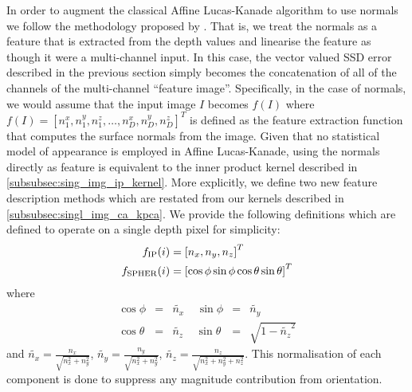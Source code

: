 In order to augment the classical Affine Lucas-Kanade algorithm to use normals
we follow the methodology proposed by \citet{antonakos2015feature}. That is,
we treat the normals as a feature that is extracted from the depth values
and linearise the feature as though it were a multi-channel input. In this case,
the vector valued SSD error described in the previous section simply
becomes the concatenation of all of the channels of the multi-channel
``feature image''. Specifically, in the case of normals, we would assume
that the input image $I$ becomes $f(I)$ where
$f(I) = {[n^x_1, n^y_1, n^z_1, \ldots, n^x_D, n^y_D, n^z_D]}^T$ is defined as 
the feature extraction function that computes the surface normals from the 
image. Given that no statistical model of appearance is employed in Affine
Lucas-Kanade, using the normals directly as feature is equivalent to
the inner product kernel described in \cref{subsubsec:sing_img_ip_kernel}.
More explicitly, we define two new feature description methods which are
restated from our kernels described in \cref{subsubsec:singl_img_ca_kpca}.
We provide the following definitions which are defined to operate on a single
depth pixel for simplicity:
\begin{equation}
    \begin{aligned}\label{eq:normal_feature_functions}
        f_{\operatorname{IP}}(i)    &= {[n_x, n_y, n_z]}^T \\
        f_{\operatorname{SPHER}}(i) &= {[\cos \phi \sin \phi \cos \theta \sin \theta]}^T
    \end{aligned}
\end{equation}
where
\begin{equation}
    \begin{aligned}\label{eq:normalised-spherical}
        \cos \phi   &=& \tilde{n_x} \;\;\;\; \sin \phi   &=& \tilde{n_y} \\
        \cos \theta &=& \tilde{n_z} \;\;\;\; \sin \theta &=& \sqrt{1 - {\tilde{n_z}}^2}
    \end{aligned}
\end{equation}
and $\tilde{n_x} = \frac{n_x}{\sqrt{n_x^2 + n_y^2}}$,
$\tilde{n_y} = \frac{n_y}{\sqrt{n_x^2 + n_y^2}}$,
$\tilde{n_z} = \frac{n_z}{\sqrt{n_x^2 + n_y^2 + n_z^2}}$. 
This normalisation of each component is done to suppress any magnitude
contribution from orientation.

